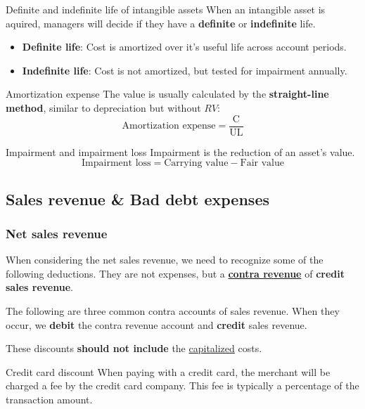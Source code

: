 \begin{definition}
    {Definite and indefinite life of intangible assets}
    When an intangible asset is aquired, managers will decide if they have a \textbf{definite} or \textbf{indefinite} life.
    \begin{itemize}
        \item \textbf{Definite life}: Cost is amortized over it's useful life across account periods.
        \item \textbf{Indefinite life}: Cost is not amortized, but tested for impairment annually.
    \end{itemize}
\end{definition}

\begin{knBox}
    {Amortization expense}
    The value is usually calculated by the \textbf{straight-line method}, similar to depreciation but without $RV$:
    \[\text{Amortization expense} = \frac{\text{C}}{\text{UL}}\]
\end{knBox}

\begin{knBox}
    {Impairment and impairment loss}
    Impairment is the reduction of an asset's value.
    \[\text{Impairment loss} = \text{Carrying value} - \text{Fair value}\]
\end{knBox}


\subsection{Sales revenue \& Bad debt expenses}

\subsubsection{Net sales revenue}

When considering the net sales revenue, we need to recognize some of the following deductions. They are not expenses, but a \hyperref[def:contra]{\textbf{contra revenue}} of \textbf{credit sales revenue}.

The following are three common contra accounts of sales revenue. When they occur, we \textbf{debit} the contra revenue account and \textbf{credit} sales revenue.

These discounts \textbf{should not include} the \hyperref[subsec:equipments]{capitalized} costs.

\begin{theorem}
    {Credit card discount}
    When paying with a credit card, the merchant will be charged a fee by the credit card company. This fee is typically a percentage of the transaction amount.
\end{theorem}

